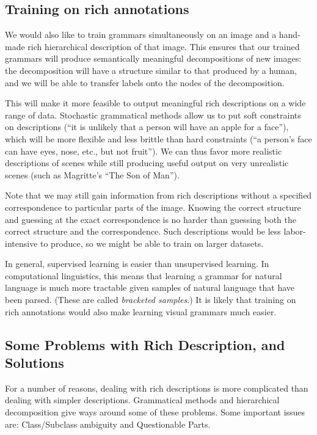 \subsection{Training on rich annotations}

We would also like to train grammars simultaneously on an image and a
hand-made rich hierarchical description of that image. This ensures
that our trained grammars will produce semantically meaningful
decompositions of new images: the decomposition will have a structure
similar to that produced by a human, and we will be able to transfer
labels onto the nodes of the decomposition.

This will make it more feasible to output meaningful rich descriptions
on a wide range of data. Stochastic grammatical methods allow us to
put soft constraints on descriptions (``it is unlikely that a person
will have an apple for a face''), which will be more flexible and less
brittle than hard constraints (``a person's face can have eyes, nose,
etc., but not fruit''). We can thus favor more realistic descriptions
of scenes while still producing useful output on very unrealistic
scenes (such as Magritte's ``The Son of Man'').

Note that we may still gain information from rich descriptions without
a specified correspondence to particular parts of the image. Knowing
the correct structure and guessing at the exact correspondence is no
harder than guessing both the correct structure and the
correspondence. Such descriptions would be less labor-intensive to
produce, so we might be able to train on larger datasets.

In general, supervised learning is easier than unsupervised
learning. In computational linguistics, this means that learning a
grammar for natural language is much more tractable given samples of
natural language that have been parsed. (These are called
\emph{bracketed samples}.) It is likely that training on rich
annotations would also make learning visual grammars much easier.

\subsection{Some Problems with Rich Description, and Solutions}

For a number of reasons, dealing with rich descriptions is more
complicated than dealing with simpler descriptions. Grammatical
methods and hierarchical decomposition give ways around some of these
problems. Some important issues are: Class/Subclass ambiguity
and Questionable Parts.

